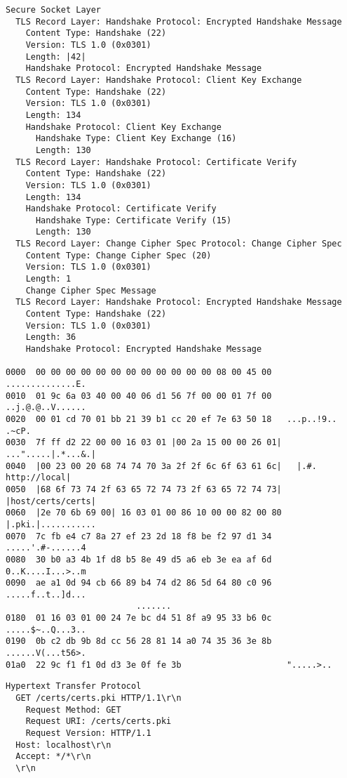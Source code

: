 \begin{lstlisting}[caption={Mensagem \tlsHsCu}]
Secure Socket Layer 
  TLS Record Layer: Handshake Protocol: Encrypted Handshake Message 
    Content Type: Handshake (22) 
    Version: TLS 1.0 (0x0301) 
    Length: |42| 
    Handshake Protocol: Encrypted Handshake Message 
  TLS Record Layer: Handshake Protocol: Client Key Exchange 
    Content Type: Handshake (22) 
    Version: TLS 1.0 (0x0301) 
    Length: 134 
    Handshake Protocol: Client Key Exchange 
      Handshake Type: Client Key Exchange (16) 
      Length: 130 
  TLS Record Layer: Handshake Protocol: Certificate Verify 
    Content Type: Handshake (22) 
    Version: TLS 1.0 (0x0301) 
    Length: 134 
    Handshake Protocol: Certificate Verify 
      Handshake Type: Certificate Verify (15) 
      Length: 130 
  TLS Record Layer: Change Cipher Spec Protocol: Change Cipher Spec 
    Content Type: Change Cipher Spec (20) 
    Version: TLS 1.0 (0x0301) 
    Length: 1 
    Change Cipher Spec Message 
  TLS Record Layer: Handshake Protocol: Encrypted Handshake Message 
    Content Type: Handshake (22) 
    Version: TLS 1.0 (0x0301) 
    Length: 36 
    Handshake Protocol: Encrypted Handshake Message 

0000  00 00 00 00 00 00 00 00 00 00 00 00 08 00 45 00   ..............E. 
0010  01 9c 6a 03 40 00 40 06 d1 56 7f 00 00 01 7f 00   ..j.@.@..V...... 
0020  00 01 cd 70 01 bb 21 39 b1 cc 20 ef 7e 63 50 18   ...p..!9.. .~cP. 
0030  7f ff d2 22 00 00 16 03 01 |00 2a 15 00 00 26 01|   ...".....|.*...&.|
0040  |00 23 00 20 68 74 74 70 3a 2f 2f 6c 6f 63 61 6c|   |.#. http://local|
0050  |68 6f 73 74 2f 63 65 72 74 73 2f 63 65 72 74 73|   |host/certs/certs|
0060  |2e 70 6b 69 00| 16 03 01 00 86 10 00 00 82 00 80   |.pki.|...........
0070  7c fb e4 c7 8a 27 ef 23 2d 18 f8 be f2 97 d1 34   .....'.#-......4
0080  30 b0 a3 4b 1f d8 b5 8e 49 d5 a6 eb 3e ea af 6d   0..K....I...>..m
0090  ae a1 0d 94 cb 66 89 b4 74 d2 86 5d 64 80 c0 96   .....f..t..]d...
                          ....... 
0180  01 16 03 01 00 24 7e bc d4 51 8f a9 95 33 b6 0c   .....$~..Q...3..
0190  0b c2 db 9b 8d cc 56 28 81 14 a0 74 35 36 3e 8b   ......V(...t56>.
01a0  22 9c f1 f1 0d d3 3e 0f fe 3b                     ".....>..
\end{lstlisting}

\begin{lstlisting}[caption={Solicitação HTTP enviada pela aplicação \texttt{s\_server}}]
Hypertext Transfer Protocol 
  GET /certs/certs.pki HTTP/1.1\r\n 
    Request Method: GET 
    Request URI: /certs/certs.pki 
    Request Version: HTTP/1.1 
  Host: localhost\r\n 
  Accept: */*\r\n 
  \r\n
\end{lstlisting}

